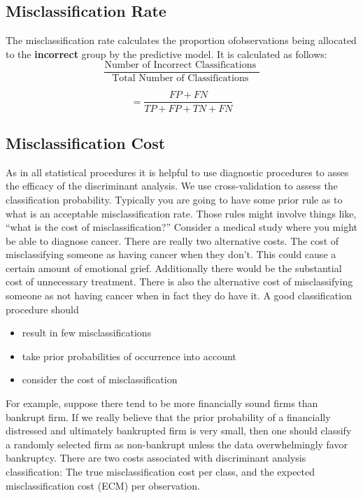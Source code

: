 \documentclass[a4paper,12pt]{article}
\begin{document}
\subsection{Misclassification Rate}
The misclassification rate calculates the proportion ofobservations being allocated to the \textbf{incorrect} group by the predictive model. It is calculated as follows:
\[ \frac{
	\mbox{Number of Incorrect Classifications }}{\mbox{Total Number of Classifications }} \]

\[ = \frac{FP + FN}{TP+FP+TN+FN}\]



\subsection*{Misclassification Cost}
As in all statistical procedures it is helpful to use diagnostic procedures to
asses the efficacy of the discriminant analysis. We use cross-validation to
assess the classification probability. Typically you are going to have some
prior rule as to what is an acceptable misclassification rate.
Those rules might involve things like, “what is the cost of misclassification?”
Consider a medical study where you might be able to diagnose cancer.
There are really two alternative costs. The cost of misclassifying someone
as having cancer when they don’t. This could cause a certain amount of emotional
grief. Additionally there would be the substantial cost of unnecessary
treatment.
There is also the alternative cost of misclassifying someone as not having
cancer when in fact they do have it.
A good classification procedure should
\begin{itemize}
	\item result in few misclassifications
	\item take prior probabilities of occurrence into account
	\item consider the cost of misclassification
\end{itemize}
For example, suppose there tend to be more financially sound firms than
bankrupt firm. If we really believe that the prior probability of a financially
distressed and ultimately bankrupted firm is very small, then one should classify
a randomly selected firm as non-bankrupt unless the data overwhelmingly
favor bankruptcy.
There are two costs associated with discriminant analysis classification:
The true misclassification cost per class, and the expected misclassification
cost (ECM) per observation.

\smallskip
\end{document}
